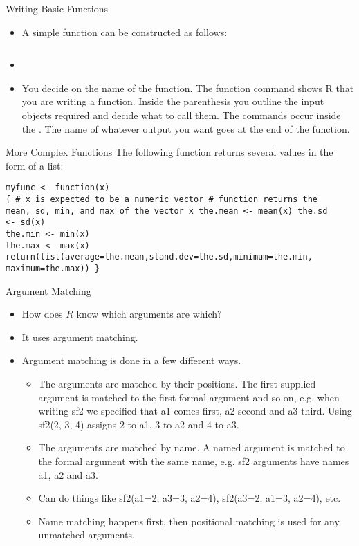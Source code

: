 \documentclass{beamer}
\begin{document}
\begin{frame}[fragile]{Writing Basic Functions}
\begin{itemize}
\item A simple function can be constructed as follows:
\begin{verbatim}

\end{verbatim}
\item \item You decide on the name of the function. The function
command shows R that you are writing a function. Inside the
parenthesis you outline the input objects required and decide what
to call them. The commands occur inside the { }. The name of
whatever output you want goes at the end of the function.
\end{itemize}
\end{frame}

\begin{frame}[fragile]{More Complex Functions}
The following function returns several values in the form of a
list:
\begin{verbatim}
myfunc <- function(x)
{ # x is expected to be a numeric vector # function returns the
mean, sd, min, and max of the vector x the.mean <- mean(x) the.sd
<- sd(x)
the.min <- min(x)
the.max <- max(x)
return(list(average=the.mean,stand.dev=the.sd,minimum=the.min,
maximum=the.max)) }
\end{verbatim}


\end{frame}

\begin{frame}[fragile]{Argument Matching}

\begin{itemize}
\item How does $R$ know which arguments are which? \item It uses argument
matching.
\item Argument matching is done in a few different ways.
\begin{itemize}
\item The arguments are matched by their positions. The first
supplied argument is matched to the first formal argument
and so on, e.g. when writing sf2 we specified that a1 comes
first, a2 second and a3 third. Using sf2(2, 3, 4) assigns 2
to a1, 3 to a2 and 4 to a3.
\item The arguments are matched by name. A named argument is
matched to the formal argument with the same name, e.g.
sf2 arguments have names a1, a2 and a3.\item Can do things like
sf2(a1=2, a3=3, a2=4), sf2(a3=2, a1=3, a2=4), etc.
\item Name matching happens first, then positional matching is
used for any unmatched arguments.
\end{itemize}
\end{itemize}
\end{frame}
\end{document}
